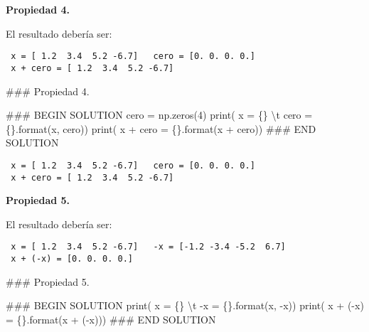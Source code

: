 \documentclass[
  letterpaper,
  DIV=11,
  numbers=noendperiod]{scrreprt}
\newenvironment{Shaded}{\begin{snugshade}}{\end{snugshade}}
\newcommand{\BuiltInTok}[1]{\textcolor[rgb]{0.00,0.23,0.31}{#1}}
\newcommand{\CharTok}[1]{\textcolor[rgb]{0.13,0.47,0.30}{#1}}
\newcommand{\CommentTok}[1]{\textcolor[rgb]{0.37,0.37,0.37}{#1}}
\newcommand{\DecValTok}[1]{\textcolor[rgb]{0.68,0.00,0.00}{#1}}
\newcommand{\NormalTok}[1]{\textcolor[rgb]{0.00,0.23,0.31}{#1}}
\newcommand{\OperatorTok}[1]{\textcolor[rgb]{0.37,0.37,0.37}{#1}}
\newcommand{\RegionMarkerTok}[1]{\textcolor[rgb]{0.00,0.23,0.31}{#1}}
\newcommand{\SpecialCharTok}[1]{\textcolor[rgb]{0.37,0.37,0.37}{#1}}
\newcommand{\StringTok}[1]{\textcolor[rgb]{0.13,0.47,0.30}{#1}}
\begin{document}
\textbf{Propiedad 4.}

El resultado debería ser:

\begin{verbatim}
 x = [ 1.2  3.4  5.2 -6.7]   cero = [0. 0. 0. 0.]
 x + cero = [ 1.2  3.4  5.2 -6.7]
\end{verbatim}

\begin{Shaded}
\begin{Highlighting}[]
\CommentTok{\#\#\# Propiedad 4.}

\CommentTok{\#\#\# }\RegionMarkerTok{BEGIN}\CommentTok{ SOLUTION}
\NormalTok{cero }\OperatorTok{=}\NormalTok{ np.zeros(}\DecValTok{4}\NormalTok{)}
\BuiltInTok{print}\NormalTok{(}\StringTok{\textquotesingle{} x = }\SpecialCharTok{\{\}}\StringTok{ }\CharTok{\textbackslash{}t}\StringTok{ cero = }\SpecialCharTok{\{\}}\StringTok{\textquotesingle{}}\NormalTok{.}\BuiltInTok{format}\NormalTok{(x, cero))}
\BuiltInTok{print}\NormalTok{(}\StringTok{\textquotesingle{} x + cero = }\SpecialCharTok{\{\}}\StringTok{\textquotesingle{}}\NormalTok{.}\BuiltInTok{format}\NormalTok{(x }\OperatorTok{+}\NormalTok{ cero))}
\CommentTok{\#\#\# }\RegionMarkerTok{END}\CommentTok{ SOLUTION}
\end{Highlighting}
\end{Shaded}

\begin{verbatim}
 x = [ 1.2  3.4  5.2 -6.7]   cero = [0. 0. 0. 0.]
 x + cero = [ 1.2  3.4  5.2 -6.7]
\end{verbatim}

\textbf{Propiedad 5.}

El resultado debería ser:

\begin{verbatim}
 x = [ 1.2  3.4  5.2 -6.7]   -x = [-1.2 -3.4 -5.2  6.7]
 x + (-x) = [0. 0. 0. 0.]
\end{verbatim}

\begin{Shaded}
\begin{Highlighting}[]
\CommentTok{\#\#\# Propiedad 5.}

\CommentTok{\#\#\# }\RegionMarkerTok{BEGIN}\CommentTok{ SOLUTION}
\BuiltInTok{print}\NormalTok{(}\StringTok{\textquotesingle{} x = }\SpecialCharTok{\{\}}\StringTok{ }\CharTok{\textbackslash{}t}\StringTok{ {-}x = }\SpecialCharTok{\{\}}\StringTok{\textquotesingle{}}\NormalTok{.}\BuiltInTok{format}\NormalTok{(x, }\OperatorTok{{-}}\NormalTok{x))}
\BuiltInTok{print}\NormalTok{(}\StringTok{\textquotesingle{} x + ({-}x) = }\SpecialCharTok{\{\}}\StringTok{\textquotesingle{}}\NormalTok{.}\BuiltInTok{format}\NormalTok{(x }\OperatorTok{+}\NormalTok{ (}\OperatorTok{{-}}\NormalTok{x)))}
\CommentTok{\#\#\# }\RegionMarkerTok{END}\CommentTok{ SOLUTION}
\end{Highlighting}
\end{Shaded}
\end{document}
